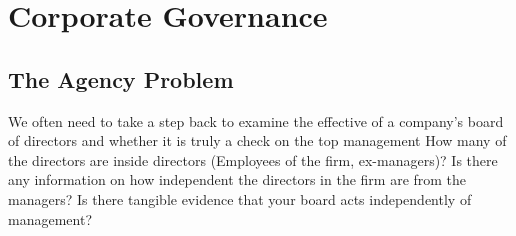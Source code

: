 \documentclass[10pt]{article}
\begin{document}
\section{Corporate Governance}

  \subsection{The Agency Problem}

    We often need to take a step back to examine the effective of a company’s board of directors and whether it is truly a check on the top management
    How many of the directors are inside directors (Employees of the firm, ex-managers)?
    Is there any information on how independent the directors in the firm are from the managers?
    Is there tangible evidence that your board acts independently of management?
\end{document}
